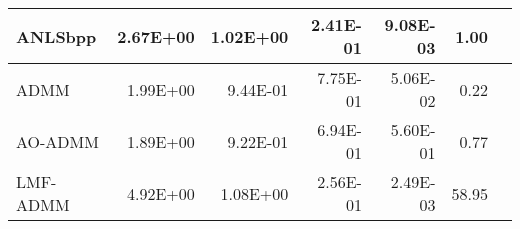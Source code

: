 \documentclass{article}
\begin{document}
\begin{table}[H]
\begin{tabular}{|l|r|r|r|r|r|l|}
		ANLSbpp  & 2.67E+00                & 1.02E+00                & 2.41E-01                 & 9.08E-03                 & 1.00                         &  \\ \hline
		ADMM     & 1.99E+00                & 9.44E-01                & 7.75E-01                 & 5.06E-02                 & 0.22                         &  \\ \hline
		AO-ADMM  & 1.89E+00                & 9.22E-01                & 6.94E-01                 & 5.60E-01                 & 0.77                         &  \\ \hline
		LMF-ADMM & 4.92E+00                & 1.08E+00                & 2.56E-01                 & 2.49E-03                 & 58.95                        &  \\ \hline
	\end{tabular}
\end{table} 
\end{document}
